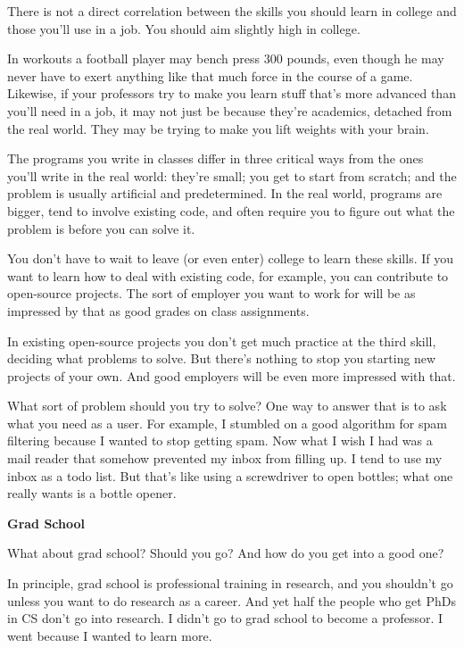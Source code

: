 \documentclass[12pt]{book}
\begin{document}
There is not a direct correlation between the skills you should learn in
college and those you'll use in a job. You should aim slightly high in
college.

In workouts a football player may bench press 300 pounds, even though he
may never have to exert anything like that much force in the course of a
game. Likewise, if your professors try to make you learn stuff that's
more advanced than you'll need in a job, it may not just be because
they're academics, detached from the real world. They may be trying to
make you lift weights with your brain.

The programs you write in classes differ in three critical ways from the
ones you'll write in the real world: they're small; you get to start
from scratch; and the problem is usually artificial and predetermined.
In the real world, programs are bigger, tend to involve existing code,
and often require you to figure out what the problem is before you can
solve it.

You don't have to wait to leave (or even enter) college to learn these
skills. If you want to learn how to deal with existing code, for
example, you can contribute to open-source projects. The sort of
employer you want to work for will be as impressed by that as good
grades on class assignments.

In existing open-source projects you don't get much practice at the
third skill, deciding what problems to solve. But there's nothing to
stop you starting new projects of your own. And good employers will be
even more impressed with that.

What sort of problem should you try to solve? One way to answer that is
to ask what you need as a user. For example, I stumbled on a good
algorithm for spam filtering because I wanted to stop getting spam. Now
what I wish I had was a mail reader that somehow prevented my inbox from
filling up. I tend to use my inbox as a todo list. But that's like using
a screwdriver to open bottles; what one really wants is a bottle opener.

\textbf{Grad School}

What about grad school? Should you go? And how do you get into a good
one?

In principle, grad school is professional training in research, and you
shouldn't go unless you want to do research as a career. And yet half
the people who get PhDs in CS don't go into research. I didn't go to
grad school to become a professor. I went because I wanted to learn
more.
\end{document}
